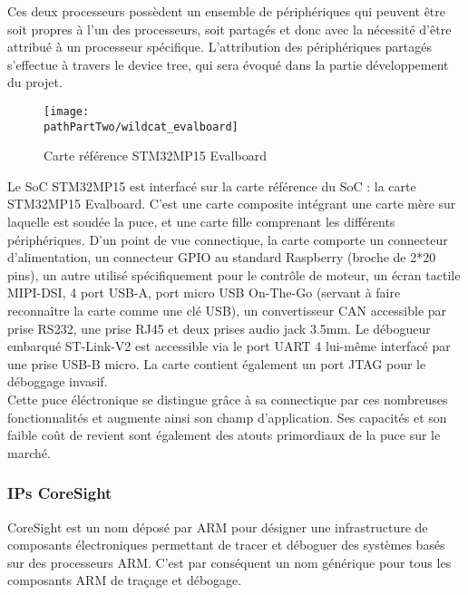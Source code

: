 Ces deux processeurs possèdent un ensemble de périphériques qui peuvent être
soit propres à l’un des processeurs, soit partagés et donc avec la nécessité
d’être attribué à un processeur spécifique. L’attribution des périphériques
partagés s’effectue à travers le device tree, qui sera évoqué dans la partie
développement du projet. \\

\begin{figure}[H]
	\begin{center}
		\texttt{[image: \\pathPartTwo/wildcat\_evalboard]}
		\caption{Carte référence STM32MP15 Evalboard}
	    \label{fig:wildcat_evalboard}
	\end{center}
\end{figure}

Le SoC STM32MP15 est interfacé sur la carte référence du SoC : la carte
STM32MP15 Evalboard. C'est une carte composite intégrant une carte mère sur
laquelle est soudée la puce, et une carte fille comprenant les différents
périphériques. D’un point de vue connectique, la carte comporte un connecteur
d'alimentation, un connecteur GPIO au standard Raspberry (broche de 2*20
pins), un autre utilisé spécifiquement pour le contrôle de moteur, un écran
tactile MIPI-DSI, 4 port USB-A, port micro USB On-The-Go (servant à faire
reconnaître la carte comme une clé USB), un convertisseur CAN accessible par
prise RS232, une prise RJ45 et deux prises audio jack 3.5mm. Le débogueur
embarqué ST-Link-V2 est accessible via le port UART 4 lui-même interfacé par
une prise USB-B micro. La carte contient également un port JTAG pour le
déboggage invasif. \\

Cette puce éléctronique se distingue grâce à sa connectique par ces nombreuses
fonctionnalités et augmente ainsi son champ d'application. Ses capacités et son
faible coût de revient sont également des atouts primordiaux de la puce sur le
marché.

\subsubsection{IPs CoreSight}
\label{sec:coresight_overview}

CoreSight est un nom déposé par ARM pour désigner une infrastructure de
composants électroniques permettant de tracer et déboguer des systèmes
basés sur des processeurs ARM. C'est par conséquent un nom générique pour tous
les composants ARM de traçage et débogage. \\

